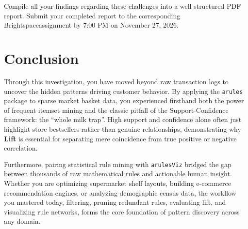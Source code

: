 \documentclass[11pt]{article}
\begin{document}
\begin{tcolorbox}[
    colback=blue!5!white,
    colframe=accentcolor,
    title=\textbf{Submission Instructions},
    fonttitle=\bfseries,
    boxrule=0.8pt,
    arc=4mm
]
Compile all your findings regarding these challenges into a well-structured PDF report. Submit your completed report to the corresponding Brightspace\texttrademark assignment by 7:00 PM on November 27, 2026.
\end{tcolorbox}

\section{Conclusion}

Through this investigation, you have moved beyond raw transaction logs to uncover the hidden patterns driving customer behavior. By applying the \texttt{arules} package to sparse market basket data, you experienced firsthand both the power of frequent itemset mining and the classic pitfall of the Support-Confidence framework: the ``whole milk trap''. High support and confidence alone often just highlight store bestsellers rather than genuine relationships, demonstrating why \textbf{Lift} is essential for separating mere coincidence from true positive or negative correlation.

Furthermore, pairing statistical rule mining with \texttt{arulesViz} bridged the gap between thousands of raw mathematical rules and actionable human insight. Whether you are optimizing supermarket shelf layouts, building e-commerce recommendation engines, or analyzing demographic census data, the workflow you mastered today, filtering, pruning redundant rules, evaluating lift, and visualizing rule networks, forms the core foundation of pattern discovery across any domain.

\nocite{*}



\end{document}
